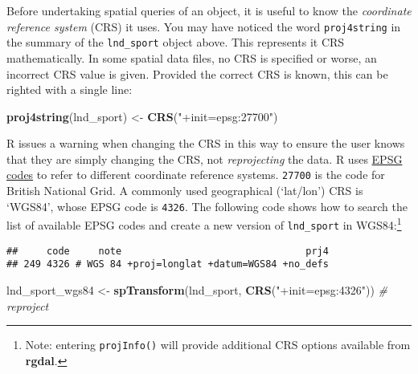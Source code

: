 \documentclass[]{article}
\newenvironment{Shaded}{}{}
\newcommand{\KeywordTok}[1]{\textcolor[rgb]{0.00,0.44,0.13}{\textbf{{#1}}}}
\newcommand{\StringTok}[1]{\textcolor[rgb]{0.25,0.44,0.63}{{#1}}}
\newcommand{\CommentTok}[1]{\textcolor[rgb]{0.38,0.63,0.69}{\textit{{#1}}}}
\newcommand{\NormalTok}[1]{{#1}}
\begin{document}
Before undertaking spatial queries of an object, it is useful to know
the \emph{coordinate reference system} (CRS) it uses. You may have
noticed the word \texttt{proj4string} in the summary of the
\texttt{lnd\_sport} object above. This represents it CRS mathematically.
In some spatial data files, no CRS is specified or worse, an incorrect
CRS value is given. Provided the correct CRS is known, this can be
righted with a single line:

\begin{Shaded}
\begin{Highlighting}[]
\KeywordTok{proj4string}\NormalTok{(lnd_sport) <-}\StringTok{ }\KeywordTok{CRS}\NormalTok{(}\StringTok{"+init=epsg:27700"}\NormalTok{)}
\end{Highlighting}
\end{Shaded}

R issues a warning when changing the CRS in this way to ensure the user
knows that they are simply changing the CRS, not \emph{reprojecting} the
data. R uses \href{}{EPSG codes} to refer to different coordinate
reference systems. \texttt{27700} is the code for British National Grid.
A commonly used geographical (`lat/lon') CRS is `WGS84', whose EPSG code
is \texttt{4326}. The following code shows how to search the list of
available EPSG codes and create a new version of \texttt{lnd\_sport} in
WGS84:\footnote{Note: entering \texttt{projInfo()} will provide
  additional CRS options available from \textbf{rgdal}.}

\begin{Shaded}
\end{Shaded}

\begin{verbatim}
##     code     note                                prj4
## 249 4326 # WGS 84 +proj=longlat +datum=WGS84 +no_defs
\end{verbatim}

\begin{Shaded}
\begin{Highlighting}[]
\NormalTok{lnd_sport_wgs84 <-}\StringTok{ }\KeywordTok{spTransform}\NormalTok{(lnd_sport, }\KeywordTok{CRS}\NormalTok{(}\StringTok{"+init=epsg:4326"}\NormalTok{)) }\CommentTok{# reproject}
\end{Highlighting}
\end{Shaded}
\end{document}
